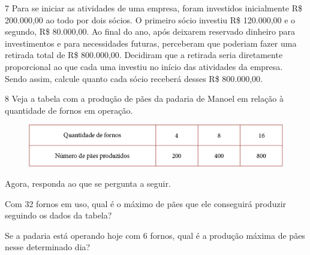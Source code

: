 \num{7} Para se iniciar as atividades de uma empresa, foram investidos
inicialmente R\$ 200.000,00 ao todo por dois sócios. O primeiro
sócio investiu R\$ 120.000,00 e o segundo, R\$ 80.000,00. Ao final do ano,
após deixarem reservado dinheiro para investimentos e para necessidades
futuras, perceberam que poderiam fazer uma retirada total de R\$ 800.000,00. Decidiram que a retirada seria diretamente proporcional ao que
cada uma investiu no início das atividades da empresa. Sendo assim,
calcule quanto cada sócio receberá desses R\$ 800.000,00.

\begin{mdframed}[linewidth=2pt,linecolor=salmao,roundcorner=2pt]





\vspace{2cm}
\end{mdframed}

\num{8} Veja a tabela com a produção de pães da padaria de Manoel em relação à quantidade de fornos em operação.

\begin{figure}[htpb!]
\centering
\includegraphics[width=\textwidth]{media/image71.png}
\end{figure}

\pagebreak
Agora, responda ao que se pergunta a seguir.

\begin{escolha}
\item
  Com 32 fornos em uso, qual é o máximo de pães que ele conseguirá
  produzir seguindo os dados da tabela?


\item
  Se a padaria está operando hoje com 6 fornos, qual é a produção máxima
  de pães nesse determinado dia?

\end{escolha}


